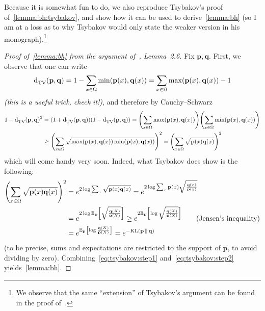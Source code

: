 \documentclass[10pt]{article}
\newcommand{\p}{\mathbf{p}}
\newcommand{\q}{\mathbf{q}}
\begin{document}
Because it is somewhat fun to do, we also reproduce Tsybakov's proof of~\autoref{lemma:bh:tsybakov}, and show how it can be used to derive~\autoref{lemma:bh} (so I am at a loss as to why Tsybakov would only state the weaker version in his monograph).\footnote{We observe that the same ``extension'' of Tsybakov's argument can be found in the proof of~\cite[Lemma 6]{GaoHRZ19}.}
\begin{proof}[Proof of~\autoref{lemma:bh} from the argument of~\cite{Tsybakov09}, Lemma~2.6]
Fix $\p,\q$. First, we observe that one can write 
\begin{equation}
  \totalvardist{\p}{\q}=1-\sum_{x\in\domain} \min(\p(x),\q(x)) = \sum_{x\in\domain} \max(\p(x),\q(x)) - 1
\end{equation}
\emph{(this is a useful trick, check it!)}, and therefore by Cauchy--Schwarz
\begin{align}
    1-\totalvardist{\p}{\q}^2 
    &= (1+\totalvardist{\p}{\q})(1-\totalvardist{\p}{\q})
    = \mleft(\sum_{x\in\domain} \max(\p(x),\q(x))\mright)\mleft(\sum_{x\in\domain} \min(\p(x),\q(x))\mright) \notag\\
    &\geq \mleft(\sum_{x\in\domain} \sqrt{\max(\p(x),\q(x))\min(\p(x),\q(x))}\mright)^2
    = \mleft(\sum_{x\in\domain} \sqrt{\p(x)\q(x)}\mright)^2 \label{eq:tsybakov:step1}
\end{align}
which will come handy very soon. Indeed, what Tsybakov does show is the following:
\begin{align}
    \mleft(\sum_{x\in\domain} \sqrt{\p(x)\q(x)}\mright)^2
    &= e^{2\log \sum_{x} \sqrt{\p(x)\q(x)}}
    = e^{2\log \sum_{x} \p(x)\sqrt{\frac{\q(x)}{\p(x)}}} \notag\\
    &= e^{2\log \shortexpect_\p\mleft[\sqrt{\frac{\q(X)}{\p(X)}}\mright]} 
    \geq e^{2\shortexpect_\p\mleft[\log \sqrt{\frac{\q(X)}{\p(X)}}\mright]} \tag{Jensen's inequality}\notag\\
    &= e^{\shortexpect_\p\mleft[\log \frac{\q(X)}{\p(X)}\mright]} 
    = e^{-\kldiv{\p}{\q}} \label{eq:tsybakov:step2}
\end{align}
(to be precise, sums and expectations are restricted to the support of $\p$, to avoid dividing by zero). Combining~\eqref{eq:tsybakov:step1} and~\eqref{eq:tsybakov:step2} yields~\autoref{lemma:bh}.
\end{proof}
\end{document}
